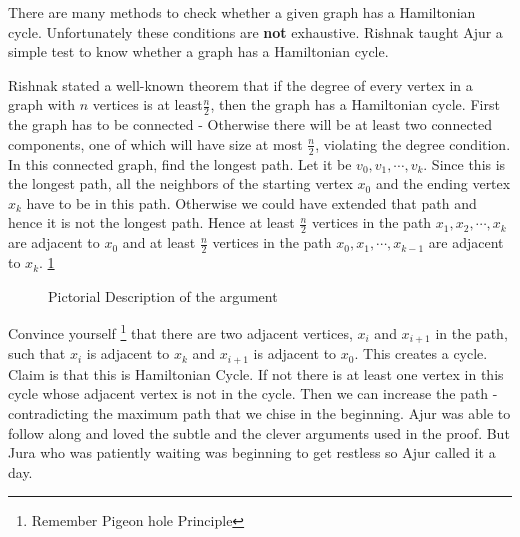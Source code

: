 There are many methods to check whether a given graph has a Hamiltonian cycle. Unfortunately these conditions are \textbf{not} exhaustive. Rishnak taught Ajur a simple test to know whether a graph has a Hamiltonian cycle.

Rishnak stated a well-known theorem that if the degree of every vertex in a graph with $n$ vertices is at least$\frac{n}{2}$, then the graph has a Hamiltonian cycle. First the graph has to be connected - Otherwise there will be at least two connected components, one of which will have size at most $\frac{n}{2}$, violating the degree condition. In this connected graph, find the longest path. Let it be $v_0,v_1,\cdots, v_k$. Since this is the longest path, all the neighbors of the starting vertex $x_0$ and the ending vertex $x_k$ have  to be in this path. Otherwise we could have extended that path and hence it is not the longest path. Hence at least $\frac{n}{2}$ vertices in the path $x_1,x_2,\cdots,x_k$ are adjacent to $x_0$ and at least $\frac{n}{2}$
 vertices in the path $x_0,x_1,\cdots,x_{k-1}$ are adjacent to $x_k$. \ref{5g100}
\begin{figure}
\begin{center}
\caption{ Pictorial Description of the argument} \label{5g100}
\end{center}
\end{figure}
 
 
 
 Convince yourself \footnote{Remember Pigeon hole Principle} that there are two adjacent vertices, $x_i$ and $x_{i+1}$ in the path, such that $x_i$ is adjacent to $x_k$ and $x_{i+1}$ is adjacent to $x_0$. This creates a cycle. Claim is that this is Hamiltonian Cycle. If not there is at least one vertex in this cycle whose adjacent vertex is not in the cycle. Then we can increase the path - contradicting the maximum path that we chise in the beginning.
Ajur was able to follow along and loved the subtle and the clever arguments used in the proof. But Jura who was patiently waiting was beginning to get restless so Ajur called it a day.

